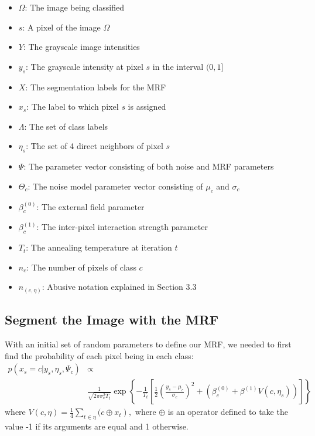 \documentclass[11pt]{article}
\begin{document}
\begin{itemize}
	\item $\Omega$: The image being classified
	\item $s$: A pixel of the image $\Omega$
	\item $Y$: The grayscale image intensities
	\item $y_{s}$: The grayscale intensity at pixel $s$ in the interval $(0,1]$
	\item $X$: The segmentation labels for the MRF
	\item $x_{s}$: The label to which pixel $s$ is assigned
	\item $\Lambda$: The set of class labels
	\item $\eta_{s}$: The set of 4 direct neighbors of pixel $s$
	\item $\Psi$: The parameter vector consisting of both noise and MRF parameters
	\item $\Theta_{c}$: The noise model parameter vector consisting of $\mu_{c}$ and $\sigma_{c}$
	\item $\beta_{c}^{(0)}$: The external field parameter
	\item $\beta_{c}^{(1)}$: The inter-pixel interaction strength parameter
	\item $T_{t}$: The annealing temperature at iteration $t$
	\item $n_{c}$: The number of pixels of class $c$
	\item $n_{(c, \eta)}$: Abusive notation explained in Section 3.3
\end{itemize}



\subsection{Segment the Image with the MRF}
With an initial set of random parameters to define our MRF, we needed to first find the probability of each pixel being in each class:
\begin{equation}
\begin{aligned}
p\left(x_{s} = c | y_{s}, \eta_{s}, \Psi_{c}\right) & \propto \\
&\frac{1}{\sqrt{2 \pi \sigma_{c}^{2} T_{t}}} \exp \left\{ -\frac{1}{T_{t}} \left[\frac{1}{2} \left(\frac{y_{s}-\mu_{c}}{\sigma_{c}}\right)^{2} + \left( \beta_{c}^{(0)} + \beta^{(1)} V(c, \eta_{s}) \right) \right] \right\}
\end{aligned}
\end{equation}
where $V(c, \eta)=\frac{1}{4} \sum_{t \in \eta}(c \oplus\left.x_{t}\right),$ where $\oplus$ is an operator defined to take the value -1 if its arguments are equal and 1 otherwise.
\end{document}
